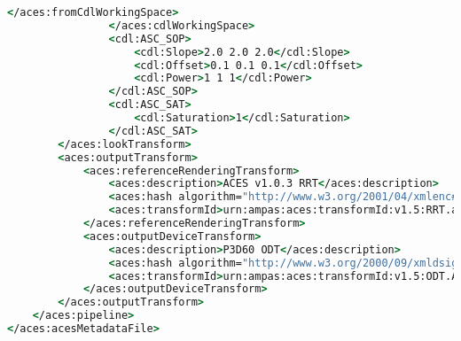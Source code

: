 \begin{lstlisting}[language=csh]
                    </aces:fromCdlWorkingSpace>
                </aces:cdlWorkingSpace>
                <cdl:ASC_SOP>
                    <cdl:Slope>2.0 2.0 2.0</cdl:Slope>
                    <cdl:Offset>0.1 0.1 0.1</cdl:Offset>
                    <cdl:Power>1 1 1</cdl:Power>
                </cdl:ASC_SOP>
                <cdl:ASC_SAT>
                    <cdl:Saturation>1</cdl:Saturation>
                </cdl:ASC_SAT>
        </aces:lookTransform>
        <aces:outputTransform>
            <aces:referenceRenderingTransform>
                <aces:description>ACES v1.0.3 RRT</aces:description>
                <aces:hash algorithm="http://www.w3.org/2001/04/xmlenc#sha256">c81af4fb4a22ee0353308e4582708951df4682bf73f838c24bf44e585fc3bb61</aces:hash>
                <aces:transformId>urn:ampas:aces:transformId:v1.5:RRT.a1.0.3</aces:transformId>
            </aces:referenceRenderingTransform>
            <aces:outputDeviceTransform>
                <aces:description>P3D60 ODT</aces:description>
                <aces:hash algorithm="http://www.w3.org/2000/09/xmldsig#sha1">efd279a82c2d52ee8c49dc0793499dc86bb1a4a3fa0dfb420d59c2814c55aea6</aces:hash>
                <aces:transformId>urn:ampas:aces:transformId:v1.5:ODT.Academy.P3D60_48nits.a1.0.3</aces:transformId>
            </aces:outputDeviceTransform>
        </aces:outputTransform>
    </aces:pipeline>
</aces:acesMetadataFile>

\end{lstlisting}


